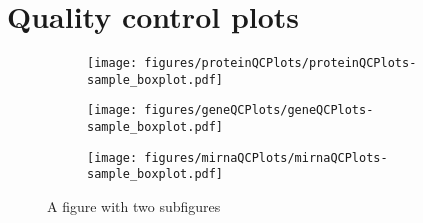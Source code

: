 


\section{Quality control plots\label{app:qc-plots}}


\begin{figure}
	\centering
	\begin{subfigure}{.9\textwidth}
		\centering
	 	\texttt{[image: figures/proteinQCPlots/proteinQCPlots-sample\_boxplot.pdf]}
	 	\subcaption{\label{fig:protein-sample-boxplot}}
	\end{subfigure}
	\begin{subfigure}{.9\textwidth}
		\centering
	 	\texttt{[image: figures/geneQCPlots/geneQCPlots-sample\_boxplot.pdf]}
	 	\subcaption{\label{fig:gene-sample-boxplot}}
	\end{subfigure}
	\begin{subfigure}{.9\textwidth}
		\centering
		\texttt{[image: figures/mirnaQCPlots/mirnaQCPlots-sample\_boxplot.pdf]}
		\subcaption{\label{fig:mirna-sample-boxplot}}
	\end{subfigure}%
	\caption{A figure with two subfigures}
	\label{fig:test}
\end{figure}


